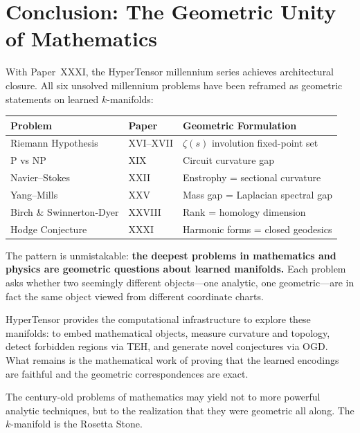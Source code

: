 \documentclass{article}
\begin{document}
\section{Conclusion: The Geometric Unity of Mathematics}
\label{sec:conclusion}

With Paper~XXXI, the HyperTensor millennium series achieves architectural
closure.  All six unsolved millennium problems have been reframed as
geometric statements on learned $k$-manifolds:

\begin{center}
\begin{tabular}{lll}
\hline
\textbf{Problem} & \textbf{Paper} & \textbf{Geometric Formulation} \\
\hline
Riemann Hypothesis & XVI--XVII & $\zeta(s)$ involution fixed-point set \\
P vs NP & XIX & Circuit curvature gap \\
Navier--Stokes & XXII & Enstrophy = sectional curvature \\
Yang--Mills & XXV & Mass gap = Laplacian spectral gap \\
Birch \& Swinnerton-Dyer & XXVIII & Rank = homology dimension \\
Hodge Conjecture & XXXI & Harmonic forms = closed geodesics \\
\hline
\end{tabular}
\end{center}

The pattern is unmistakable: \textbf{the deepest problems in mathematics and
physics are geometric questions about learned manifolds.}  Each problem asks
whether two seemingly different objects---one analytic, one geometric---are
in fact the same object viewed from different coordinate charts.

HyperTensor provides the computational infrastructure to explore these
manifolds: to embed mathematical objects, measure curvature and topology,
detect forbidden regions via TEH, and generate novel conjectures via OGD.
What remains is the mathematical work of proving that the learned encodings
are faithful and the geometric correspondences are exact.

The century-old problems of mathematics may yield not to more powerful
analytic techniques, but to the realization that they were geometric all
along.  The $k$-manifold is the Rosetta Stone.
\end{document}
